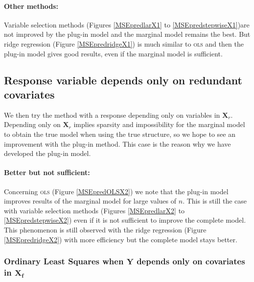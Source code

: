 \documentclass[12pt,a4paper]{report}
\begin{document}
\paragraph{Other methods:} Variable selection methods (Figures \ref{MSEpredlarX1} to \ref{MSEpredstepwiseX1})are not improved by the plug-in model and the marginal model remains the best. But ridge regression (Figure \ref{MSEpredridgeX1}) is much similar to \textsc{ols} and then the plug-in model gives good results, even if the marginal model is sufficient.


	 \subsection{Response variable depends only on redundant covariates }
 \label{tableMSEsimgauchepred}
We then try the method with a response depending only on variables in $\boldsymbol{X}_r$. 
Depending only on $\boldsymbol{X}_r$ implies sparsity and impossibility for the marginal model to obtain the true model when using the true structure, so we hope to see an improvement with the plug-in method. This case is the reason why we have developed the plug-in model. \\

\paragraph{Better but not sufficient:} Concerning \textsc{ols} (Figure \ref{MSEpredOLSX2}) we note that the plug-in model improves results of the marginal model for large values of $n$. This is still the case with variable selection methods (Figures \ref{MSEpredlarX2} to \ref{MSEpredstepwiseX2}) even if it is not sufficient to improve the complete model. This phenomenon is still observed with the ridge regression (Figure \ref{MSEpredridgeX2}) with more efficiency but the complete model stays better.\\

	

 
 
\FloatBarrier

\newpage
	\setcellgapes{1pt}
\subsubsection{Ordinary Least Squares when $\boldsymbol{Y}$ depends only on covariates in $\boldsymbol{X_f}$}
\end{document}
